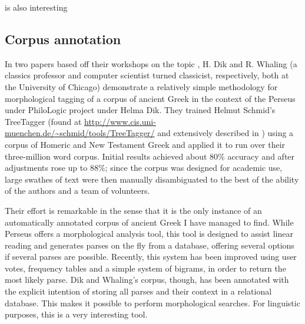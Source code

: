 \cite{lee2010dependency} is also interesting 

\subsection{Corpus annotation}
\label{sec:dikwhaling}
In two papers based off their workshops on the topic
\citep{dik2008,dik2009}, H. Dik and R. Whaling (a classics professor
and computer scientist turned classicist, respectively, both at the
University of Chicago) demonstrate a relatively simple methodology for
morphological tagging of a corpus of ancient Greek in the context of
the Perseus under PhiloLogic project under Helma Dik.  They trained
Helmut Schmid's TreeTagger (found at
\url{http://www.cis.uni-muenchen.de/~schmid/tools/TreeTagger/} and
extensively described in \cite{schmid1994,schmid1995}) using a corpus
of Homeric and New Testament Greek and applied it to run over their
three-million word corpus. Initial results achieved about 80\%
accuracy and after adjustments rose up to 88\%; since the corpus was
designed for academic use, large swathes of text were then manually
disambiguated to the best of the ability of the authors and a team of
volunteers.

Their effort is remarkable in the sense that it is the only instance
of an automatically annotated corpus of ancient Greek I have managed
to find. While Perseus offers a morphological analysis tool, this tool
is designed to assist linear reading and generates parses on the fly
from a database, offering several options if several parses are
possible. Recently, this system has been improved using user votes,
frequency tables and a simple system of bigrams, in order to return
the most likely parse. Dik and Whaling's corpus, though, has been
annotated with the explicit intention of storing all parses and their
context in a relational database. This makes it possible to perform
morphological searches. For linguistic purposes, this is a very
interesting tool.